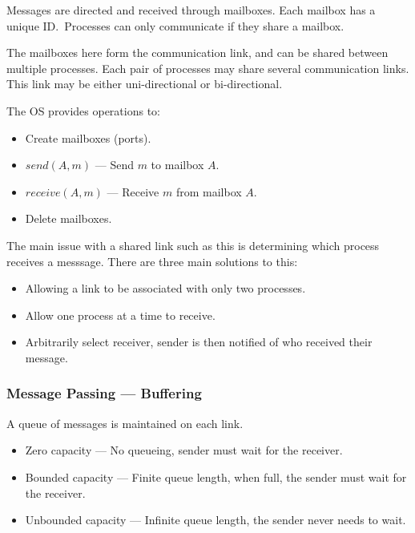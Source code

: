 Messages are directed and received through mailboxes. Each mailbox has
a unique ID.\ Processes can only communicate if they share a mailbox.

The mailboxes here form the communication link, and can be shared between
multiple processes. Each pair of processes may share several communication
links. This link may be either uni-directional or bi-directional.

The OS provides operations to:
\begin{itemize}
    \item Create mailboxes (ports).
    \item $send(A, m)$ --- Send $m$ to mailbox $A$.
    \item $receive(A, m)$ --- Receive $m$ from mailbox $A$.
    \item Delete mailboxes.
\end{itemize}

The main issue with a shared link such as this is determining which
process receives a messsage. There are three main solutions to this:
\begin{itemize}
    \item Allowing a link to be associated with only two processes.
    \item Allow one process at a time to receive.
    \item Arbitrarily select receiver, sender is then notified of who received their message.
\end{itemize}


\subsubsection{Message Passing --- Buffering}

A queue of messages is maintained on each link.
\begin{itemize}
    \item Zero capacity --- No queueing, sender must wait for the receiver.
    \item Bounded capacity --- Finite queue length, when full, the sender must wait for the receiver.
    \item Unbounded capacity --- Infinite queue length, the sender never needs to wait.
\end{itemize}